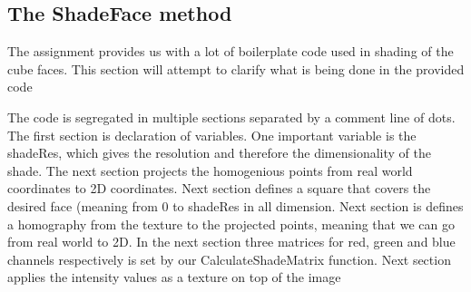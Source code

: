 \subsection{The ShadeFace method}

The assignment provides us with a lot of boilerplate code used in shading of
the cube faces. This section will attempt to clarify what is being done in the
provided code

The code is segregated in multiple sections separated by a comment line of dots.
The first section is declaration of variables. One important variable is the
shadeRes, which gives the resolution and therefore the dimensionality of the
shade. The next section projects the homogenious points from real world
coordinates to 2D coordinates. Next section defines a square that covers the
desired face (meaning from 0 to shadeRes in all dimension. Next section is
defines a homography from the texture to the projected points, meaning that
we can go from real world to 2D. In the next section three matrices for red,
green and blue channels respectively is set by our CalculateShadeMatrix
function. Next section applies the intensity values as a texture on top of the
image 
